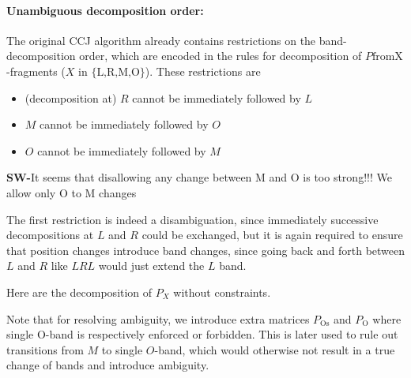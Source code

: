 \documentclass[11pt]{article} %
\newcommand{\SW}[1]{\textbf{SW-}#1}
\newcommand{\POnone}{P_{\text{O}}}
\newcommand{\POSnone}{P_{\text{Os}}}
\begin{document}
\paragraph{Unambiguous decomposition order:}
The original CCJ algorithm already contains restrictions on the band-decomposition order, which are encoded in the rules for decomposition of $P\text{fromX}$-fragments ($X$ in $\{\text{L,R,M,O}\}$). These restrictions are
\begin{itemize}
\item (decomposition at) $R$ cannot be immediately followed by $L$
\item $M$ cannot be immediately followed by $O$ 
\item $O$ cannot be immediately followed by $M$
\end{itemize} 
\SW{It seems that disallowing any change between M and O is too strong!!! We allow only O to M changes}

The first restriction is indeed a disambiguation, since immediately successive decompositions at $L$ and $R$ could be exchanged, but it is again required to ensure that position changes introduce band changes, since going back and forth between $L$ and $R$ like $LRL$ would just extend the $L$ band. 


Here are the decomposition of $P_X$ without constraints.

Note that for resolving ambiguity, we introduce extra matrices $\POSnone$ and $\POnone$ where single O-band is respectively enforced or forbidden. This is later used to rule out transitions from $M$ to single $O$-band, which would otherwise not result in a true change of bands and introduce ambiguity.
\end{document}
